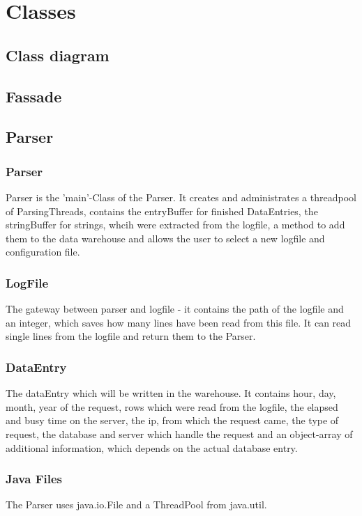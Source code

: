 \section{Classes}

\subsection{Class diagram}

\subsection{Fassade}

\subsection{Parser}

\subsubsection*{Parser}
Parser is the 'main'-Class of the Parser. It creates and administrates a threadpool of ParsingThreads,
contains the entryBuffer for finished DataEntries, the stringBuffer for strings, whcih were extracted
from the logfile, a method to add them to the data warehouse
and allows the user to select a new logfile and configuration file.

\subsubsection*{LogFile}
The gateway between parser and logfile - it contains the path of the logfile and an integer, 
which saves how many lines have been read from this file. It can read single lines from the logfile and return them to 
the Parser.

\subsubsection*{DataEntry}
The dataEntry which will be written in the warehouse. It contains hour, day, month, year of the request, rows which were read 
from the logfile, the elapsed and busy time on the server, the ip, from which the request came, the type of request, the database
and server which handle the request and an object-array of additional information, which depends on the actual database entry.

\subsubsection*{Java Files}
The Parser uses java.io.File and a ThreadPool from java.util.

